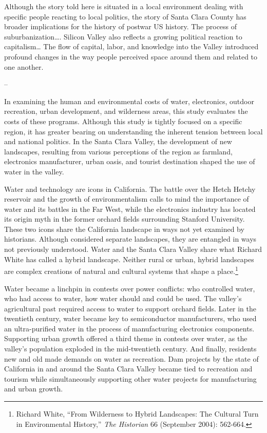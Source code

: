 \documentclass[11pt,article,oneside]{memoir}
\begin{document}
Although the story told here is situated in a local environment dealing
with specific people reacting to local politics, the story of Santa
Clara County has broader implications for the history of postwar US
history. The process of suburbanization\ldots{}. Silicon Valley also
reflects a growing political reaction to capitalism\ldots{} The flow of
capital, labor, and knowledge into the Valley introduced profound
changes in the way people perceived space around them and related to one
another.

--

In examining the human and environmental costs of water, electronics,
outdoor recreation, urban development, and wilderness areas, this study
evaluates the costs of these programs. Although this study is tightly
focused on a specific region, it has greater bearing on understanding
the inherent tension between local and national politics. In the Santa
Clara Valley, the development of new landscapes, resulting from various
perceptions of the region as farmland, electronics manufacturer, urban
oasis, and tourist destination shaped the use of water in the valley.

Water and technology are icons in California. The battle over the Hetch
Hetchy reservoir and the growth of environmentalism calls to mind the
importance of water and its battles in the Far West, while the
electronics industry has located its origin myth in the former orchard
fields surrounding Stanford University. These two icons share the
California landscape in ways not yet examined by historians. Although
considered separate landscapes, they are entangled in ways not
previously understood. Water and the Santa Clara Valley share what
Richard White has called a hybrid landscape. Neither rural or urban,
hybrid landscapes are complex creations of natural and cultural systems
that shape a place.\footnote{Richard White, ``From Wilderness to Hybrid
  Landscapes: The Cultural Turn in Environmental History,'' \emph{The
  Historian} 66 (September 2004): 562-664.}

Water became a linchpin in contests over power conflicts: who controlled
water, who had access to water, how water should and could be used. The
valley's agricultural past required access to water to support orchard
fields. Later in the twentieth century, water became key to
semiconductor manufacturers, who used an ultra-purified water in the
process of manufacturing electronics components. Supporting urban growth
offered a third theme in contests over water, as the valley's population
exploded in the mid-twentieth century. And finally, residents new and
old made demands on water as recreation. Dam projects by the state of
California in and around the Santa Clara Valley became tied to
recreation and tourism while simultaneously supporting other water
projects for manufacturing and urban growth.
\end{document}
